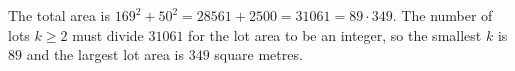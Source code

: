The total area is $169^2+50^2=28561+2500=31061=89\cdot349$. The number of lots $k\ge2$ must divide $31061$ for the lot area to be an integer, so the smallest $k$ is $89$ and the largest lot area is $\boxed{349}$ square metres.

